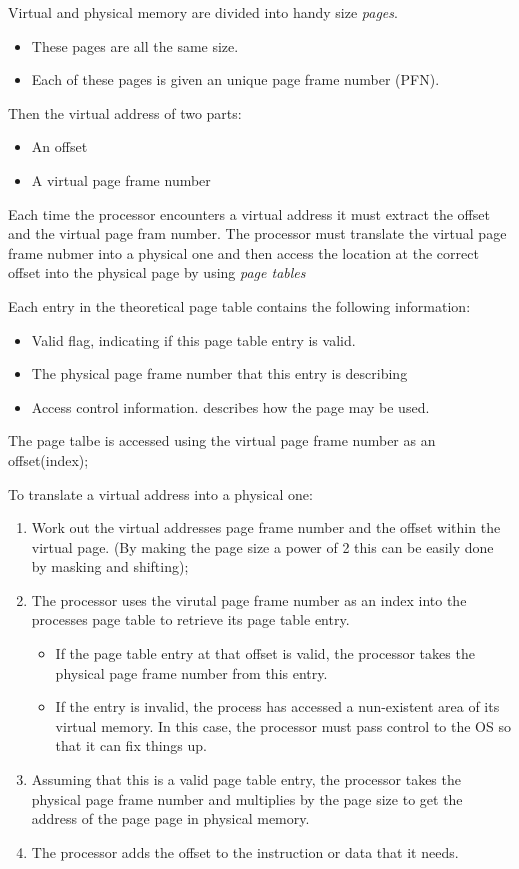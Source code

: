 \documentclass[a4paper,12pt]{book}
\begin{document}
Virtual and physical memory are divided into handy size \emph{pages}. 
\begin{itemize}
\item These pages are all the same size. 
\item Each of these pages is given an unique page frame number (PFN).
\end{itemize}

Then the virtual address of two parts:
\begin{itemize}
\item An offset
\item A virtual page frame number
\end{itemize}
Each time the processor encounters a virtual address it must extract the offset
and the virtual page fram number. The processor must translate the virtual page
frame nubmer into a physical one and then access the location at the correct
offset into the physical page by using \emph{page tables}

Each entry in the theoretical page table contains the following information:
\begin{itemize}
\item Valid flag, indicating if this page table entry is valid.
\item The physical page frame number that this entry is describing
\item Access control information. describes how the page may be used. 
\end{itemize}
The page talbe is accessed using the virtual page frame number as an
offset(index);

To translate a virtual address into a physical one:
\begin{enumerate}
\item Work out the virtual addresses page frame number and the offset within the
virtual page. (By making the page size a power of 2 this can be easily done by
masking and shifting);
\item The processor uses the virutal page frame number as an index into the
processes page table to retrieve its page table entry. 
  \begin{itemize}
    \item If the page table entry at that offset is valid, the processor takes
    the physical page frame number from this entry. 
    \item If the entry is invalid, the process has accessed a nun-existent area
    of its virtual memory. In this case, the processor must pass control to the
    OS so that it can fix things up.
  \end{itemize}
\item Assuming that this is a valid page table entry, the processor takes the
physical page frame number and multiplies by the page size to get the address of
the page page in physical memory.
\item The processor adds the offset to the instruction or data that it needs.
\end{enumerate}
\end{document}
